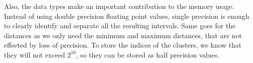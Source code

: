 Also, the data types make an important contribution to the memory usage. Instead of using double precision floating point values, single precision is enough to clearly identify and separate all the resulting intervals. Same goes for the distances as we only need the minimum and maximum distances, that are not effected by loss of precision. To store the indices of the clusters, we know that they will not exceed $2^{16}$, so they can be stored as half precision values.
